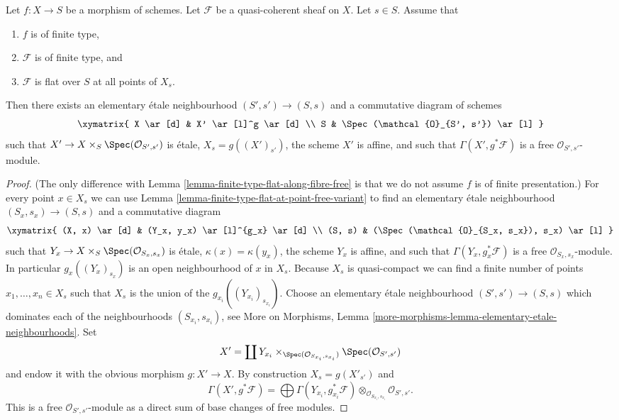 \begin{lemma}
\label{lemma-finite-type-flat-along-fibre-free-variant}
Let $f : X \to S$ be a morphism of schemes.
Let $\mathcal{F}$ be a quasi-coherent sheaf on $X$.
Let $s \in S$.
Assume that
\begin{enumerate}
\item $f$ is of finite type,
\item $\mathcal{F}$ is of finite type, and
\item $\mathcal{F}$ is flat over $S$ at all points of $X_s$.
\end{enumerate}
Then there exists an elementary \'etale neighbourhood $(S', s') \to (S, s)$
and a commutative diagram of schemes
$$
\xymatrix{
X \ar[d] & X' \ar[l]^g \ar[d] \\
S & \Spec(\mathcal{O}_{S', s'}) \ar[l]
}
$$
such that $X' \to X \times_S \Spec(\mathcal{O}_{S', s'})$
is \'etale, $X_s = g((X')_{s'})$, the scheme $X'$ is affine,
and such that $\Gamma(X', g^*\mathcal{F})$ is a free
$\mathcal{O}_{S', s'}$-module.
\end{lemma}

\begin{proof}
(The only difference with
Lemma \ref{lemma-finite-type-flat-along-fibre-free}
is that we do not assume $f$ is of finite presentation.)
For every point $x \in X_s$ we can use
Lemma \ref{lemma-finite-type-flat-at-point-free-variant}
to find an elementary \'etale neighbourhood $(S_x , s_x) \to (S, s)$
and a commutative diagram
$$
\xymatrix{
(X, x) \ar[d] & (Y_x, y_x) \ar[l]^{g_x} \ar[d] \\
(S, s) & (\Spec(\mathcal{O}_{S_x, s_x}), s_x) \ar[l]
}
$$
such that $Y_x \to X \times_S \Spec(\mathcal{O}_{S_x, s_x})$
is \'etale, $\kappa(x) = \kappa(y_x)$, the scheme $Y_x$ is affine, and
such that $\Gamma(Y_x, g_x^*\mathcal{F})$ is a free
$\mathcal{O}_{S_x, s_x}$-module. In particular
$g_x((Y_x)_{s_x})$ is an open neighbourhood of $x$ in $X_s$.
Because $X_s$ is quasi-compact we can find a finite number of points
$x_1, \ldots, x_n \in X_s$ such that $X_s$ is the union of
the $g_{x_i}((Y_{x_i})_{s_{x_i}})$. Choose an elementary \'etale neighbourhood
$(S' , s') \to (S, s)$ which dominates each of the neighbourhoods
$(S_{x_i}, s_{x_i})$, see
More on Morphisms,
Lemma \ref{more-morphisms-lemma-elementary-etale-neighbourhoods}.
Set
$$
X' = \coprod Y_{x_i} \times_{\Spec(\mathcal{O}_{S_{x_i}, s_{x_i}})}
\Spec(\mathcal{O}_{S', s'})
$$
and endow it with the obvious morphism $g : X' \to X$.
By construction $X_s = g(X'_{s'})$ and
$$
\Gamma(X', g^*\mathcal{F})
=
\bigoplus \Gamma(Y_{x_i}, g_{x_i}^*\mathcal{F})
\otimes_{\mathcal{O}_{S_{x_i}, s_{x_i}}}
\mathcal{O}_{S', s'}.
$$
This is a free $\mathcal{O}_{S', s'}$-module as a direct sum
of base changes of free modules.
\end{proof}
